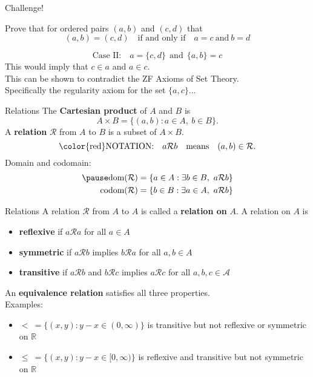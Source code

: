 \documentclass{beamer}
\begin{document}
\begin{frame}{Challenge!}
\begin{prob}
Prove that for ordered pairs $(a,b)$ and $(c,d)$ that
$$(a,b)=(c,d)\quad\text{if and only if}\quad a=c\ \text{and}\ b=d$$
\end{prob}
\begin{soln}
$$\text{Case II:}\quad a=\{c,d\}\ \ \text{and}\ \ \{a,b\} = c$$
\pause
This would imply that $c\in a$ and $a\in c$.\\
\pause
This can be shown to contradict the ZF Axioms of Set Theory.\\
\pause
Specifically the regularity axiom for the set $\{a,c\}$...
\end{soln}
\end{frame}

\begin{frame}{Relations}
The \textbf{Cartesian product} of $A$ and $B$ is
$$A\times B = \{(a,b): a\in A,\ b\in B\}.$$
\pause
A \textbf{relation} $\mathcal R$ from $A$ to $B$ is a subset of $A\times B$.\\
\pause
$$\text{\color{red}NOTATION:}\quad a\mathcal R b\quad\text{means}\quad (a,b)\in \mathcal R.$$
\pause
Domain and codomain:
\pause
\begin{align*}
\pause
\text{dom}(\mathcal{R}) &= \{a\in A: \exists b\in B,\ a\mathcal R b\}\\
\text{codom}(\mathcal{R}) &= \{b\in B: \exists a\in A,\ a\mathcal R b\}
\end{align*}
\end{frame}

\begin{frame}{Relations}
A relation $\mathcal R$ from $A$ to $A$ is called a \textbf{relation on} $A$.  A relation on $A$ is
\begin{itemize}
\pause
\item \textbf{reflexive} if $a\mathcal Ra$ for all $a\in A$
\pause
\item \textbf{symmetric} if $a\mathcal Rb$ implies $b\mathcal Ra$ for all $a,b\in A$
\pause
\item \textbf{transitive} if $a\mathcal Rb$ and $b\mathcal Rc$ implies $a\mathcal Rc$ for all $a,b,c\in\mathcal A$
\end{itemize}
\pause
An \textbf{equivalence relation} satisfies all three properties.\\
\pause
Examples:
\pause
\begin{itemize}
\pause
\item $<\ = \{(x,y): y-x\in (0,\infty)\}$ is transitive but not reflexive or symmetric on $\mathbb{R}$
\pause
\item $\leq\ = \{(x,y): y-x\in [0,\infty)\}$ is reflexive and transitive but not symmetric on $\mathbb{R}$
\end{itemize}
\end{frame}
\end{document}
